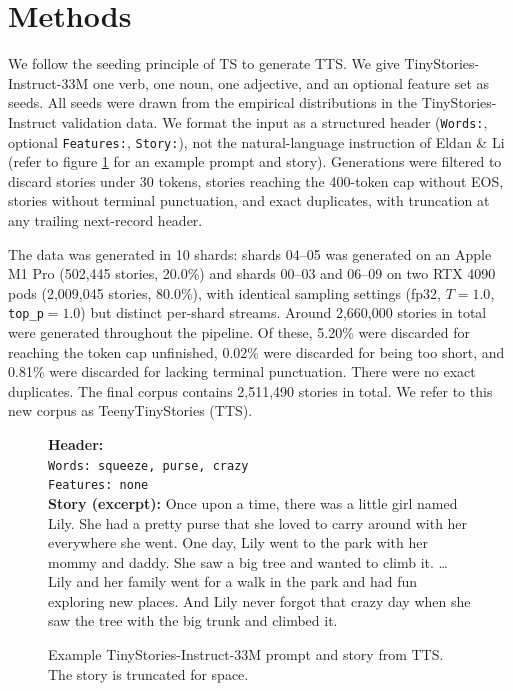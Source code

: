 \documentclass{article}
\begin{document}
\section{Methods}
We follow the seeding principle of TS to generate TTS. We give TinyStories-Instruct-33M one verb, one noun, one adjective, and an optional feature set as seeds. All seeds were drawn from the empirical distributions in the TinyStories-Instruct validation data. We format the input as a structured header (\texttt{Words:}, optional \texttt{Features:}, \texttt{Story:}), not the natural-language instruction of Eldan \& Li (refer to figure \ref{fig:tts-example} for an example prompt and story). Generations were filtered to discard stories under 30 tokens, stories reaching the 400-token cap without EOS, stories without terminal punctuation, and exact duplicates, with truncation at any trailing next-record header.

The data was generated in 10 shards: shards 04--05 was generated on an Apple M1 Pro (502,445 stories, 20.0\%) and shards 00--03 and 06--09 on two RTX 4090 pods (2,009,045 stories, 80.0\%), with identical sampling settings (fp32, $T{=}1.0$, \texttt{top\_p}${=}1.0$) but distinct per-shard streams. Around 2,660,000 stories in total were generated throughout the pipeline. Of these, 5.20\% were discarded for reaching the token cap unfinished, 0.02\% were discarded for being too short, and 0.81\% were discarded for lacking terminal punctuation. There were no exact duplicates. The final corpus contains 2,511,490 stories in total. We refer to this new corpus as TeenyTinyStories (TTS). 

\begin{figure}[H]
  \centering
  \begin{tcolorbox}[storybox, title={TeenyTinyStories prompt and generated story}]
    \textbf{Header:}\\[-2pt]
    \texttt{Words: squeeze, purse, crazy}\\
    \texttt{Features: none}\\[4pt]
    \textbf{Story (excerpt):} Once upon a time, there was a little girl named Lily. She had a pretty purse that she loved to carry around with her everywhere she went. One day, Lily went to the park with her mommy and daddy. She saw a big tree and wanted to climb it. 
    \ldots
    Lily and her family went for a walk in the park and had fun exploring new places. And Lily never forgot that crazy day when she saw the tree with the big trunk and climbed it.
  \end{tcolorbox}
  \caption{Example TinyStories-Instruct-33M prompt and story from TTS. The story is truncated for space.}
  \label{fig:tts-example}
\end{figure}
\end{document}
